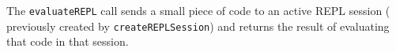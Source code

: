The \verb+evaluateREPL+ call sends a small piece of \Reflex code to an active REPL session (
previously created by \verb+createREPLSession+) and returns the result of evaluating that code in that
session.
